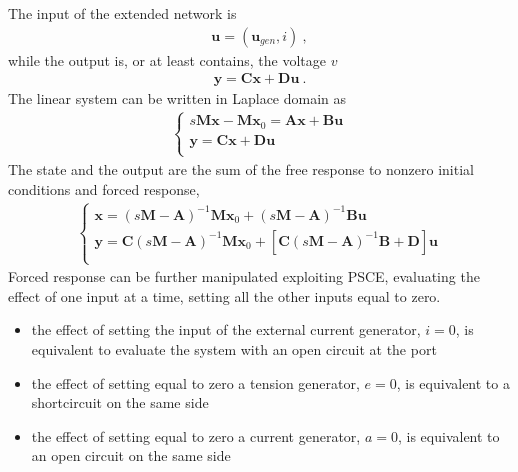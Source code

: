 \documentclass[letterpaper,10pt,english]{jupyterBook}
\begin{document}
\sphinxAtStartPar
The input of the extended network is
\begin{equation*}
\begin{split}\mathbf{u} = ( \mathbf{u}_{gen}, i ) \ ,\end{split}
\end{equation*}
\sphinxAtStartPar
while the output is, or at least contains, the voltage \(v\)
\begin{equation*}
\begin{split}\mathbf{y} = \mathbf{C} \mathbf{x} + \mathbf{D} \mathbf{u} \ .\end{split}
\end{equation*}
\sphinxAtStartPar
The linear system can be written in Laplace domain as
\begin{equation*}
\begin{split}\begin{cases}
  s \mathbf{M} \mathbf{x} - \mathbf{M} \mathbf{x}_0  = \mathbf{A} \mathbf{x} + \mathbf{B} \mathbf{u} \\
  \mathbf{y} = \mathbf{C} \mathbf{x} + \mathbf{D} \mathbf{u} \\
\end{cases}\end{split}
\end{equation*}
\sphinxAtStartPar
The state and the output are the sum of the free response to non\sphinxhyphen{}zero initial conditions and forced response,
\begin{equation*}
\begin{split}\begin{cases}
  \mathbf{x} = (s \mathbf{M} - \mathbf{A})^{-1} \mathbf{M} \mathbf{x}_0 + (s \mathbf{M} - \mathbf{A})^{-1} \mathbf{B} \mathbf{u} \\
  \mathbf{y} = \mathbf{C} (s \mathbf{M} - \mathbf{A})^{-1} \mathbf{M} \mathbf{x}_0 + \left[ \mathbf{C} (s \mathbf{M} - \mathbf{A})^{-1} \mathbf{B} + \mathbf{D} \right] \mathbf{u} \\
\end{cases}\end{split}
\end{equation*}
\sphinxAtStartPar
Forced response can be further manipulated exploiting PSCE, evaluating the effect of one input at a time, setting all the other inputs equal to zero.
\begin{itemize}
\item {} 
\sphinxAtStartPar
the effect of setting the input of the external current generator, \(i = 0\), is equivalent to evaluate the system with an open circuit at the port

\item {} 
\sphinxAtStartPar
the effect of setting equal to zero a tension generator, \(e = 0\), is equivalent to a short\sphinxhyphen{}circuit on the same side

\item {} 
\sphinxAtStartPar
the effect of setting equal to zero a current generator, \(a = 0\), is equivalent to an open circuit on the same side

\end{itemize}
\end{document}
